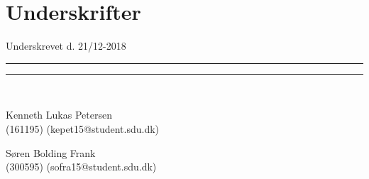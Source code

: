 
\section*{Underskrifter}
\vspace{3ex} \hfill Underskrevet d. 21/12-2018\\

\newlength{\streg} \setlength{\streg}{0.49\linewidth}

\vspace*{\fill} \rule{\streg}{1pt} \hfill \rule{\streg}{1pt}\\
\begin{minipage}[b]{\streg}
 \centering
 \rule{0pt}{4ex}
 Kenneth Lukas Petersen \\
 {\footnotesize (161195) (kepet15@student.sdu.dk)}
\end{minipage}
\hfill
\begin{minipage}[b]{\streg}
 \centering
Søren Bolding Frank \\
 {\footnotesize (300595) (sofra15@student.sdu.dk)}
\end{minipage}
\vspace*{\fill}